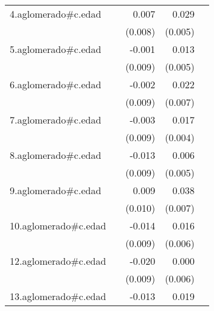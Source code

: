 {\begin{longtable}{l*{4}{D{.}{.}{-1}}}
\addlinespace
4.aglomerado#c.edad&                     &       0.007         &       0.029\sym{***}&                     \\
            &                     &     (0.008)         &     (0.005)         &                     \\
\addlinespace
5.aglomerado#c.edad&                     &      -0.001         &       0.013\sym{*}  &                     \\
            &                     &     (0.009)         &     (0.005)         &                     \\
\addlinespace
6.aglomerado#c.edad&                     &      -0.002         &       0.022\sym{**} &                     \\
            &                     &     (0.009)         &     (0.007)         &                     \\
\addlinespace
7.aglomerado#c.edad&                     &      -0.003         &       0.017\sym{***}&                     \\
            &                     &     (0.009)         &     (0.004)         &                     \\
\addlinespace
8.aglomerado#c.edad&                     &      -0.013         &       0.006         &                     \\
            &                     &     (0.009)         &     (0.005)         &                     \\
\addlinespace
9.aglomerado#c.edad&                     &       0.009         &       0.038\sym{***}&                     \\
            &                     &     (0.010)         &     (0.007)         &                     \\
\addlinespace
10.aglomerado#c.edad&                     &      -0.014         &       0.016\sym{*}  &                     \\
            &                     &     (0.009)         &     (0.006)         &                     \\
\addlinespace
12.aglomerado#c.edad&                     &      -0.020\sym{*}  &       0.000         &                     \\
            &                     &     (0.009)         &     (0.006)         &                     \\
\addlinespace
13.aglomerado#c.edad&                     &      -0.013         &       0.019\sym{***}&                     \\

\end{longtable}}

